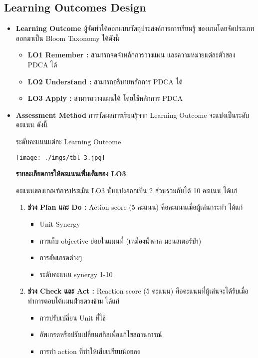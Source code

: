 \documentclass[12pt,oneside,openright,a4paper]{cpe-thai-project}
\begin{document}
\subsection{Learning Outcomes Design}
\begin{itemize}
  \item \textbf{Learning Outcome} ผู้จัดทำได้ออกแบบวัตถุประสงค์การการเรียนรู้
  ของเกมโดยจัดประเภทออกมาเป็น Bloom Taxonomy ได้ดังนี้

  \begin{itemize}
    \item \textbf{LO1 Remember :} สามารถจดจำหลักการวางแผน
    และความหมายแต่ละตัวของ PDCA ได้
    \item \textbf{LO2 Understand :} สามารถอธิบายหลักการ PDCA ได้
    \item \textbf{LO3 Apply :} สามารถวางแผนได้ โดยใช้หลักการ PDCA
  \end{itemize}

  \item \textbf{Assessment Method} การวัดผลการเรียนรู้จาก 
  Learning Outcome จะแบ่งเป็นระดับคะแนน ดังนี้

  \begin{table}[H]
    \caption{ระดับคะแนนแต่ละ Learning Outcome}\label{tbl:tab-3}
    \centering
    \texttt{[image: ./imgs/tbl-3.jpg]}
  \end{table}

  \textbf{รายละเอียดการให้คะแนนเพิ่มเติมของ LO3}

  คะแนนของเกณฑ์การประเมิน LO3 นั้นแบ่งออกเป็น 2 ส่วนรวมกันได้ 10 คะแนน ได้แก่

  \begin{enumerate}
    \item \textbf{ช่วง Plan และ Do :} Action score (5 คะแนน) 
    คือคะแนนเมื่อผู้เล่นกระทำ ได้แก่ 

    \begin{itemize}
      \item Unit Synergy 
      \item การเก็บ objective ย่อยในแผนที่ (เหมืองน้ำตาล มอนสเตอร์ป่า) 
      \item การอัพเกรดต่างๆ
      \item ระดับคะแนน synergy 1-10
    \end{itemize}

    \item \textbf{ช่วง Check และ Act :} Reaction score (5 คะแนน) 
    คือคะแนนที่ผู้เล่นจะได้รับเมื่อทำการตอบโต้แผนฝ่ายตรงข้าม ได้แก่

    \begin{itemize}
      \item การปรับเปลี่ยน Unit ที่ใช้
      \item อัพเกรดหรือปรับเปลี่ยนสกิลเพื่อแก้ไขสถานการณ์
      \item การทำ action ที่ทำให้เสียเปรียบน้อยลง
    \end{itemize}

  \end{enumerate}

\end{itemize}
\end{document}
